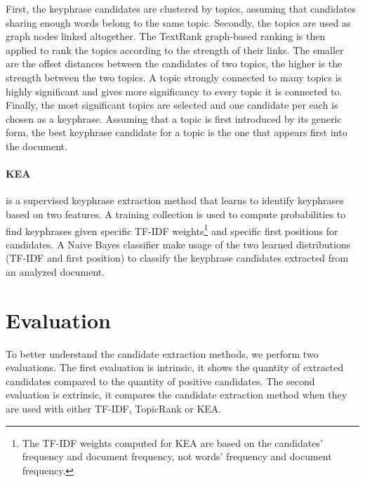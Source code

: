   First, the keyphrase candidates are clustered by topics, assuming that
  candidates sharing enough words belong to the same topic. Secondly, the
  topics are used as graph nodes linked altogether. The TextRank graph-based
  ranking is then applied to rank the topics according to the strength of their
  links. The smaller are the offset distances between the candidates of two
  topics, the higher is the strength between the two topics. A topic strongly
  connected to many topics is highly significant and gives more significancy to
  every topic it is connected to. Finally, the most significant topics are
  selected and one candidate per each is chosen as a keyphrase. Assuming that a
  topic is first introduced by its generic form, the best keyphrase candidate
  for a topic is the one that appears first into the document.

  \paragraph{KEA} is a supervised keyphrase extraction method that learns to
  identify keyphrases based on two features. A training collection is used to
  compute probabilities to find keyphrases given specific TF-IDF
  weights\footnote{The TF-IDF weights computed for KEA are based on the
  candidates' frequency and document frequency, not words' frequency and
  document frequency.} and specific first positions for candidates. A Naive
  Bayes classifier make usage of the two learned distributions (TF-IDF and first
  position) to classify the keyphrase candidates extracted from an analyzed
  document.

\section{Evaluation}
\label{sec:evaluation}
  To better understand the candidate extraction methods, we perform two
  evaluations. The first evaluation is intrinsic, it shows the quantity of
  extracted candidates compared to the quantity of positive candidates. The
  second evaluation is extrinsic, it compares the candidate extraction method
  when they are used with either TF-IDF, TopicRank or KEA.

